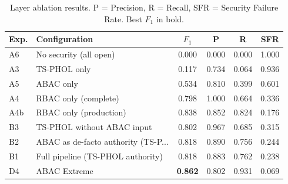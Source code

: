 \begin{table}[t]
\centering
\caption{Layer ablation results. P = Precision, R = Recall, SFR = Security Failure Rate. Best $F_1$ in bold.}
\label{tab:ablation}
\footnotesize
\begin{tabular}{@{}llcccc@{}}
\toprule
Exp. & Configuration & $F_1$ & P & R & SFR \\
\midrule
  A6 & No security (all open) & 0.000 & 0.000 & 0.000 & 1.000 \\
  A3 & TS-PHOL only & 0.117 & 0.734 & 0.064 & 0.936 \\
  A5 & ABAC only & 0.534 & 0.810 & 0.399 & 0.601 \\
  A4 & RBAC only (complete) & 0.798 & 1.000 & 0.664 & 0.336 \\
  A4b & RBAC only (production) & 0.838 & 0.852 & 0.824 & 0.176 \\
  B3 & TS-PHOL without ABAC input & 0.802 & 0.967 & 0.685 & 0.315 \\
  B2 & ABAC as de-facto authority (TS-P... & 0.818 & 0.890 & 0.756 & 0.244 \\
  B1 & Full pipeline (TS-PHOL authority) & 0.818 & 0.883 & 0.762 & 0.238 \\
  D4 & ABAC Extreme & \textbf{0.862} & 0.802 & 0.931 & 0.069 \\
\bottomrule
\end{tabular}
\end{table}